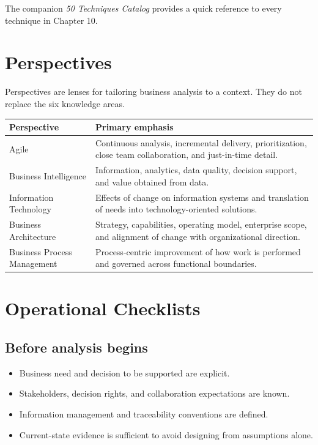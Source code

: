 \documentclass[11pt]{article}
\begin{document}
The companion \emph{50 Techniques Catalog} provides a quick reference to every technique in Chapter 10.
\section{Perspectives}
Perspectives are lenses for tailoring business analysis to a context. They do not replace the six knowledge areas.
\begin{longtable}{L{0.20\textwidth} L{0.68\textwidth}}
\toprule
\textbf{Perspective} & \textbf{Primary emphasis}\\
\midrule
Agile & Continuous analysis, incremental delivery, prioritization, close team collaboration, and just-in-time detail.\\
Business Intelligence & Information, analytics, data quality, decision support, and value obtained from data.\\
Information Technology & Effects of change on information systems and translation of needs into technology-oriented solutions.\\
Business Architecture & Strategy, capabilities, operating model, enterprise scope, and alignment of change with organizational direction.\\
Business Process Management & Process-centric improvement of how work is performed and governed across functional boundaries.\\
\bottomrule
\end{longtable}
\section{Operational Checklists}
\subsection{Before analysis begins}
\begin{itemize}
\item Business need and decision to be supported are explicit.
\item Stakeholders, decision rights, and collaboration expectations are known.
\item Information management and traceability conventions are defined.
\item Current-state evidence is sufficient to avoid designing from assumptions alone.
\end{itemize}
\end{document}
